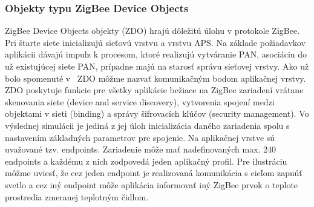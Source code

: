 \subsubsection{Objekty typu ZigBee Device Objects}
\indent\indent ZigBee Device Objects objekty (ZDO) hrajú dôležitú úlohu v protokole ZigBee. Pri štarte siete inicializujú sieťovú vrstvu a vrstvu APS. Na základe požiadavkov aplikácii dávajú impulz k procesom, ktoré realizujú vytváranie PAN, asociáciu do už existujúcej siete PAN, prípadne majú na starosť správu sieťovej vrstvy. Ako už bolo spomenuté v~\cite{halas03} ZDO môžme nazvať komunikačným bodom aplikačnej vrstvy. ZDO poskytuje funkcie pre všetky aplikácie bežiace na ZigBee zariadení vrátane skenovania siete (device and service discovery), vytvorenia spojení medzi objektami v sieti (binding) a správy šifrovacích kľúčov (security management). Vo výslednej simulácii je jediná z jej úloh inicializácia daného zariadenia spolu s nastavením základných parametrov pre spojenie. Na aplikačnej vrstve sú uvažované tzv. endpoints. Zariadenie môže mať nadefinovaných max. 240 endpoints a každému z nich zodpovedá jeden aplikačný profil. Pre ilustráciu môžme uviesť, že cez jeden endpoint je realizovaná komunikácia s cieľom zapnúť svetlo a cez iný endpoint môže aplikácia informovať iný ZigBee prvok o teplote prostredia zmeranej teplotným čidlom.\\
